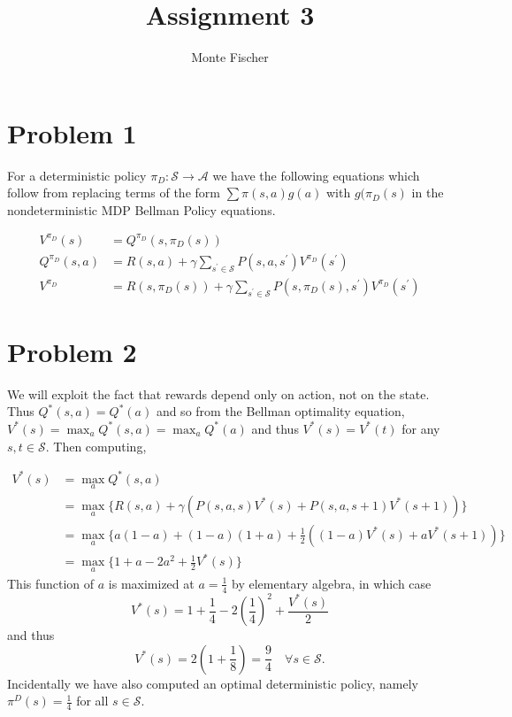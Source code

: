 \documentclass{article}
\title{Assignment 3}
\author{Monte Fischer}
\begin{document}
\maketitle

\section*{Problem 1}
For a deterministic policy $\pi_D: \mathcal{S} \to \mathcal{A}$ we have the following equations which follow from replacing terms of the form $\sum \pi(s, a) g(a)$ with $g(\pi_D(s)$ in the nondeterministic MDP Bellman Policy equations.

\begin{align}
    V^{\pi_D}(s) &= Q^{\pi_D}(s, \pi_D(s)) \\
    Q^{\pi_D}(s,a) &= R(s,a) + \gamma \sum_{s^\prime \in \mathcal{S}} P(s,a,s^\prime) V^{\pi_D}(s^\prime) \\
    V^{\pi_D} &= R(s, \pi_D(s)) + \gamma \sum_{s^\prime \in \mathcal{S}} P(s,\pi_D(s),s^\prime)V^{\pi_D}(s^\prime)
\end{align}

\section*{Problem 2}

We will exploit the fact that rewards depend only on action, not on the state. Thus $Q^*(s,a) = Q^*(a)$ and so from the Bellman optimality equation, $V^*(s) = \max_a Q^*(s,a) = \max_a Q^*(a)$ and thus $V^*(s) = V^*(t)$ for any $s,t \in \mathcal{S}$. Then computing,

\begin{align}
    V^*(s) &= \max_a Q^*(s,a)\\
           &= \max_a \{ R(s,a) + \gamma (P(s,a,s)V^*(s) + P(s,a,s+1)V^*(s+1))\}\\
           &= \max_a \{ a(1-a) + (1-a)(1+a) + \frac{1}{2}((1-a)V^*(s) + aV^*(s+1)) \}\\
           &= \max_a \{ 1 + a - 2a^2 + \frac{1}{2} V^*(s)\}
\end{align}
This function of $a$ is maximized at $a = \frac{1}{4}$ by elementary algebra, in which case
\[V^*(s) = 1 + \frac{1}{4} -2\left(\frac{1}{4}\right)^2 + \frac{V^*(s)}{2}\]
and thus
\[ V^*(s) = 2\left(1 + \frac{1}{8}\right) = \frac{9}{4} \quad \forall s \in \mathcal{S}.\]
Incidentally we have also computed an optimal deterministic policy, namely $\pi^D(s) = \frac{1}{4}$ for all $s \in \mathcal{S}$.
\end{document}
